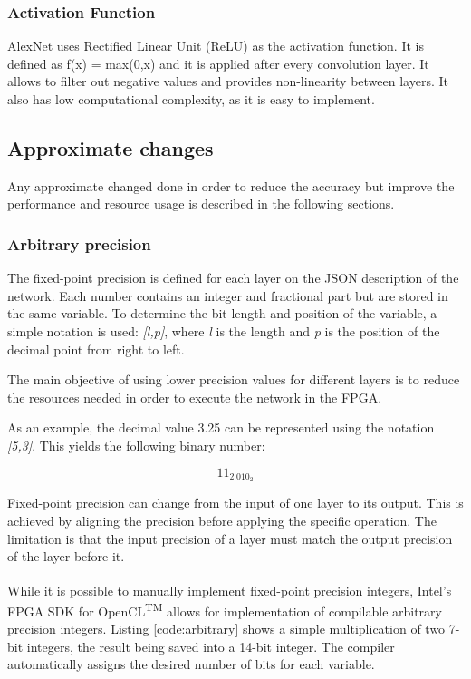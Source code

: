 \begin{enumerate}
\subsubsection{Activation Function}

AlexNet uses Rectified Linear Unit (ReLU) as the activation function. 
It is defined as f(x) = max(0,x) and it is applied after every convolution layer.
It allows to filter out negative values and provides non-linearity between layers. It also
has low computational complexity, as it is easy to implement.


\subsection{Approximate changes}

Any approximate changed done in order to reduce the accuracy but improve the performance
and resource usage is described in the following sections.

\subsubsection{Arbitrary precision}

The fixed-point precision is defined for each layer on the JSON description of the network.
Each number contains an integer and fractional part but are stored in the same variable.
To determine the bit length and position of the variable, a simple notation is used: 
\textit{[l,p]}, where \textit{l} is the length and \textit{p} is the position of the decimal
point from right to left.

The main objective of using lower precision values for different layers is to reduce the
resources needed in order to execute the network in the FPGA.

As an example, the decimal value 3.25 can be represented using the notation \textit{[5,3]}.
This yields the following binary number:

$$
11_2.010_2
$$

Fixed-point precision can change from the input of one layer to its output. This is achieved
by aligning the precision before applying the specific operation. The limitation is that the
input precision of a layer must match the output precision of the layer before it.

While it is possible to manually implement fixed-point precision integers,
Intel's\textsuperscript{\textregistered} FPGA SDK for OpenCL\textsuperscript{TM} allows for implementation
of compilable arbitrary precision integers. Listing \ref{code:arbitrary} shows a simple
multiplication of two 7-bit integers, the result being saved into a 14-bit integer. The
compiler automatically assigns the desired number of bits for each variable.


\end{enumerate}
